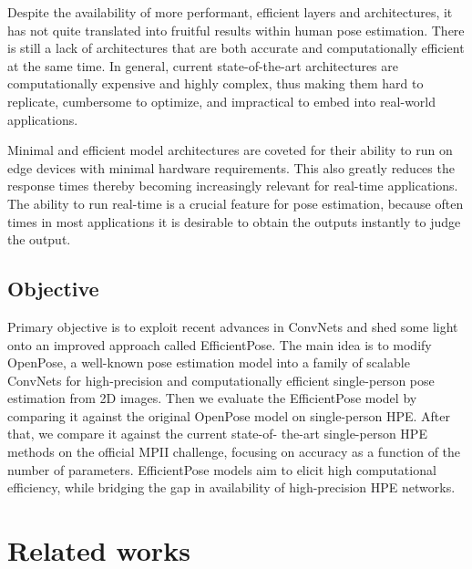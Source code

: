 \documentclass{fisatprojectfinal}
\begin{document}
Despite the availability of more performant, efficient layers and architectures, it has not quite translated
into fruitful results within human pose estimation. There is still a lack of architectures that
are both accurate and computationally efficient at the same
time. In general, current state-of-the-art architectures are
computationally expensive and highly complex, thus making them hard to replicate, cumbersome to optimize, and
impractical to embed into real-world applications. \par

Minimal and efficient model architectures are coveted for their ability to run on edge devices with minimal hardware requirements.
This also greatly reduces the response times thereby becoming increasingly relevant for real-time applications.
The ability to run real-time is a crucial feature for pose estimation, because often times in most applications it is desirable to obtain the outputs instantly to judge the output.

\section{Objective}

Primary objective is to exploit recent advances in ConvNets and shed some light onto
an improved approach called EfficientPose. The main idea
is to modify OpenPose, a well-known pose estimation model into a family of scalable ConvNets
for high-precision and computationally efficient single-person
pose estimation from 2D images. 
Then we evaluate the EfficientPose model by comparing
it against the original OpenPose model on single-person
HPE. After that, we compare it against the current state-of-
the-art single-person HPE methods on the official MPII
challenge, focusing on accuracy as a function of the number
of parameters. EfficientPose models aim to
elicit high computational efficiency, while bridging the gap
in availability of high-precision HPE networks.

\chapter{Related works}
\end{document}
